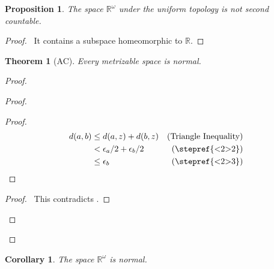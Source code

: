 \documentclass{report}
\let\qed\relax
\newtheorem{prop}[lm]{Proposition}
\newtheorem{thm}[lm]{Theorem}
\newtheorem{cor}{Corollary}[lm]
\theoremstyle{definition}
\begin{document}
  \begin{prop}
    The space $\mathbb{R}^\omega$ under the uniform topology is not second
countable.
  \end{prop}

  \begin{proof}
    \pf\ It contains a subspace homeomorphic to $\mathbb{R}$. \qed
  \end{proof}

    \begin{thm}[AC]
      \label{thm:topology:metric:normal}
   Every metrizable space is normal.
  \end{thm}

  \begin{proof}
   \pf
   \begin{proof}
     \begin{proof}
       \pf
       \begin{align*}
         d(a, b) & \leq d(a, z) + d(b, z) & (\text{Triangle Inequality}) \\
         & < \epsilon_a / 2 + \epsilon_b / 2 & (\text{\stepref{<2>2}}) \\
         & \leq \epsilon_b & (\text{\stepref{<2>3}})
       \end{align*}
     \end{proof}
     \qedstep
     \begin{proof}
       \pf\ This contradicts .
     \end{proof}
   \end{proof}
   \qed
  \end{proof}

  \begin{cor}
    The space $\mathbb{R}^\omega$ is normal.
  \end{cor}
\end{document}
